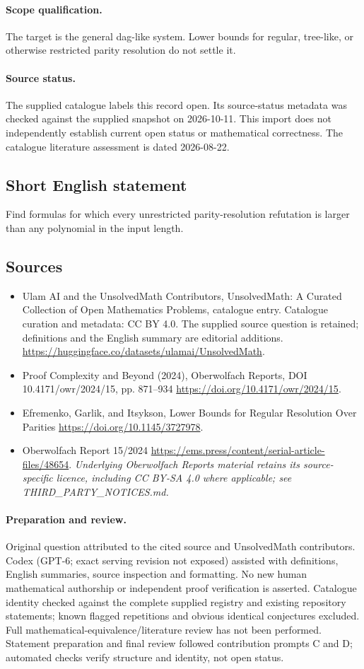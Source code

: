 \documentclass[11pt]{article}
\begin{document}
\paragraph{Scope qualification.}
The target is the general dag-like system. Lower bounds for regular, tree-like, or otherwise restricted parity resolution do not settle it.
\paragraph{Source status.}
The supplied catalogue labels this record open. Its source-status metadata was checked against the supplied snapshot on 2026-10-11. This import does not independently establish current open status or mathematical correctness. The catalogue literature assessment is dated 2026-08-22.
\subsection{Short English statement}
Find formulas for which every unrestricted parity-resolution refutation is larger than any polynomial in the input length.
\subsection{Sources}
\begin{itemize}
\item[S1] Ulam AI and the UnsolvedMath Contributors, UnsolvedMath: A Curated Collection of Open Mathematics Problems, catalogue entry. Catalogue curation and metadata: CC BY 4.0. The supplied source question is retained; definitions and the English summary are editorial additions.
\url{https://huggingface.co/datasets/ulamai/UnsolvedMath}.
\item[S2] Proof Complexity and Beyond (2024), Oberwolfach Reports, DOI 10.4171/owr/2024/15, pp. 871--934
\url{https://doi.org/10.4171/owr/2024/15}.
\item[S3] Efremenko, Garlik, and Itsykson, Lower Bounds for Regular Resolution Over Parities
\url{https://doi.org/10.1145/3727978}.
\item[S4] Oberwolfach Report 15/2024
\url{https://ems.press/content/serial-article-files/48654}.
\textit{Underlying Oberwolfach Reports material retains its source-specific licence, including CC BY-SA 4.0 where applicable; see THIRD\_PARTY\_NOTICES.md.}
\end{itemize}
\paragraph{Preparation and review.}
Original question attributed to the cited source and UnsolvedMath contributors. Codex (GPT-6; exact serving revision not exposed) assisted with definitions, English summaries, source inspection and formatting. No new human mathematical authorship or independent proof verification is asserted. Catalogue identity checked against the complete supplied registry and existing repository statements; known flagged repetitions and obvious identical conjectures excluded. Full mathematical-equivalence/literature review has not been performed. Statement preparation and final review followed contribution prompts C and D; automated checks verify structure and identity, not open status.
\label{end:statement}
\end{document}
